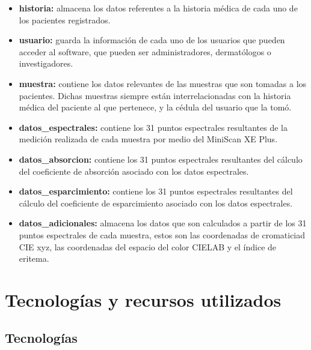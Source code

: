 		\begin{itemize}
				
				\item \textbf{historia:} almacena los datos referentes a la historia m\'{e}dica de cada uno de los pacientes registrados.
				
				\item \textbf{usuario:} guarda la informaci\'{o}n de cada uno de los usuarios que pueden acceder al software, que pueden ser administradores, dermat\'{o}logos o investigadores.
				
				\item \textbf{muestra:} contiene los datos relevantes de las muestras que son tomadas a los pacientes. Dichas muestras siempre est\'{a}n interrelacionadas con la historia m\'{e}dica del paciente al que pertenece, y la c\'{e}dula del usuario que la tom\'{o}.

				\item \textbf{datos\_espectrales:} contiene los 31 puntos espectrales resultantes de la medici\'{o}n realizada de cada muestra por medio del MiniScan XE Plus.
				
				\item \textbf{datos\_absorcion:} contiene los 31 puntos espectrales resultantes del c\'{a}lculo del coeficiente de absorci\'{o}n asociado con los datos espectrales.
				
				\item \textbf{datos\_esparcimiento:} contiene los 31 puntos espectrales resultantes del c\'{a}lculo del coeficiente de esparcimiento asociado con los datos espectrales.
				
				\item \textbf{datos\_adicionales:} almacena los datos que son calculados a partir de los 31 puntos espectrales de cada muestra, estos son las coordenadas de cromaticiad CIE xyz, las coordenadas del espacio del color CIELAB y el \'{i}ndice de eritema.
				
		\end{itemize}

\section{Tecnolog\'{i}as y recursos utilizados}

	\subsection{Tecnolog\'{i}as}
	
